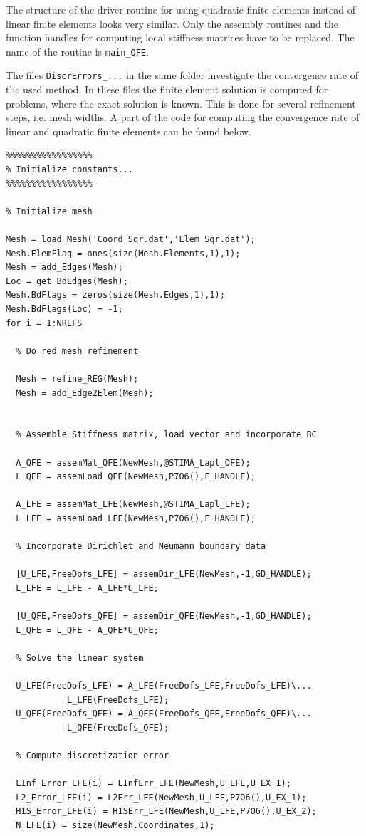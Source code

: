 The structure of the driver routine for using quadratic finite elements instead of linear finite elements looks very similar. Only the assembly routines and the function handles for computing local stiffness matrices have to be replaced. The name of the routine is \texttt{main\_QFE}.

The files \texttt{DiscrErrors\_...} in the same folder investigate the convergence rate of the used method. In these files the finite element solution is computed for problems, where the exact solution is known. This is done for several refinement steps, i.e. mesh widths. A part of the code for computing the convergence rate of linear and quadratic finite elements can be found below.

\begin{lstlisting}
%%%%%%%%%%%%%%%%%
% Initialize constants...
%%%%%%%%%%%%%%%%%

% Initialize mesh

Mesh = load_Mesh('Coord_Sqr.dat','Elem_Sqr.dat');
Mesh.ElemFlag = ones(size(Mesh.Elements,1),1);
Mesh = add_Edges(Mesh);
Loc = get_BdEdges(Mesh);
Mesh.BdFlags = zeros(size(Mesh.Edges,1),1);
Mesh.BdFlags(Loc) = -1;
for i = 1:NREFS
    
  % Do red mesh refinement  
    
  Mesh = refine_REG(Mesh);    
  Mesh = add_Edge2Elem(Mesh);
  
    
  % Assemble Stiffness matrix, load vector and incorporate BC

  A_QFE = assemMat_QFE(NewMesh,@STIMA_Lapl_QFE);
  L_QFE = assemLoad_QFE(NewMesh,P7O6(),F_HANDLE);
  
  A_LFE = assemMat_LFE(NewMesh,@STIMA_Lapl_LFE);
  L_LFE = assemLoad_LFE(NewMesh,P7O6(),F_HANDLE);
  
  % Incorporate Dirichlet and Neumann boundary data
       
  [U_LFE,FreeDofs_LFE] = assemDir_LFE(NewMesh,-1,GD_HANDLE);
  L_LFE = L_LFE - A_LFE*U_LFE;
  
  [U_QFE,FreeDofs_QFE] = assemDir_QFE(NewMesh,-1,GD_HANDLE);
  L_QFE = L_QFE - A_QFE*U_QFE;    
  
  % Solve the linear system

  U_LFE(FreeDofs_LFE) = A_LFE(FreeDofs_LFE,FreeDofs_LFE)\...
  			L_LFE(FreeDofs_LFE);
  U_QFE(FreeDofs_QFE) = A_QFE(FreeDofs_QFE,FreeDofs_QFE)\...
  			L_QFE(FreeDofs_QFE);
    
  % Compute discretization error
    
  LInf_Error_LFE(i) = LInfErr_LFE(NewMesh,U_LFE,U_EX_1);
  L2_Error_LFE(i) = L2Err_LFE(NewMesh,U_LFE,P7O6(),U_EX_1);
  H1S_Error_LFE(i) = H1SErr_LFE(NewMesh,U_LFE,P7O6(),U_EX_2);
  N_LFE(i) = size(NewMesh.Coordinates,1);
    

\end{lstlisting}
